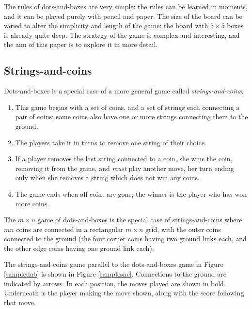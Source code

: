 \documentclass[a4paper,twocolumn]{article}
\begin{document}
\begin{figure*}
  \centering
  \def\svgscale{0.7}
  
  \caption{Sample strings-and-coins game equivalent to Figure \ref{sampledab}}
  \label{samplesnc}
\end{figure*}

The rules of dots-and-boxes are very simple: the rules can be learned
in moments, and it can be played purely with pencil and paper. The
size of the board can be varied to alter the simplicity and length of
the game: the board with $5 \times 5$ boxes is already quite deep. The
strategy of the game is complex and interesting, and the aim of this
paper is to explore it in more detail.

\subsection{Strings-and-coins}

Dots-and-boxes is a special case of a more general game called
\emph{strings-and-coins}.

\begin{enumerate}
  \item This game begins with a set of coins, and a set of strings
    each connecting a pair of coins; some coins also have one or more
    strings connecting them to the ground.
  \item The players take it in turns to remove one string of their
    choice.
  \item If a player removes the last string connected to a coin, she
    wins the coin, removing it from the game, and \emph{must} play
    another move, her turn ending only when she removes a string which
    does not win any coins.
  \item The game ends when all coins are gone; the winner is the
    player who has won more coins.
\end{enumerate}

The $m \times n$ game of dots-and-boxes is the special case of
strings-and-coins where $mn$ coins are connected in a rectangular $m
\times n$ grid, with the outer coins connected to the ground (the four
corner coins having two ground links each, and the other edge coins
having one ground link each).

The strings-and-coins game parallel to the dots-and-boxes game in
Figure \ref{sampledab} is shown in Figure \ref{samplesnc}. Connections
to the ground are indicated by arrows. In each position, the moves
played are shown in bold. Underneath is the player making the move
shown, along with the score following that move.
\end{document}
